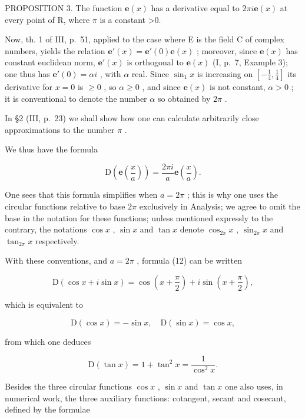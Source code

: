 PROPOSITION 3. The function \(\mathbf{e}(x)\) has a derivative equal to \(2\pi i\mathbf{e}(x)\) at every point of R, where \(\pi\) is a constant \textgreater0.

Now, th. 1 of III, p.~51, applied to the case where E is the field C of complex numbers, yields the relation \(\mathbf{e}'(x) = \mathbf{e}'(0)\mathbf{e}(x)\) ; moreover, since \(\mathbf{e}(x)\) has constant euclidean norm, \(\mathbf{e}'(x)\) is orthogonal to \(\mathbf{e}(x)\) (I, p.~7, Example 3); one thus has \(\mathbf{e}'(0) = \alpha i\) , with \(\alpha\) real. Since \(\sin_1 x\) is increasing on \([- \frac{1}{4}, \frac{1}{4}]\) its derivative for \(x = 0\) is \(\geqslant 0\) , so \(\alpha \geqslant 0\) , and since \(\mathbf{e}(x)\) is not constant, \(\alpha > 0\) ; it is conventional to denote the number \(\alpha\) so obtained by \(2\pi\) .

In §2 (III, p.~23) we shall show how one can calculate arbitrarily close approximations to the number \(\pi\) .

We thus have the formula

\[
\mathrm{D} \left(\mathbf {e} \left(\frac {x}{a}\right)\right) = \frac {2 \pi i}{a} \mathbf {e} \left(\frac {x}{a}\right).\tag{12}
\]

One sees that this formula simplifies when \(a = 2\pi\) ; this is why one uses the circular functions relative to base \(2\pi\) exclusively in Analysis; we agree to omit the base in the notation for these functions; unless mentioned expressly to the contrary, the notations \(\cos x\) , \(\sin x\) and \(\tan x\) denote \(\cos_{2\pi}x\) , \(\sin_{2\pi}x\) and \(\tan_{2\pi}x\) respectively.

With these conventions, and \(a = 2\pi\) , formula (12) can be written

\[
\mathrm{D} (\cos x + i \sin x) = \cos \left(x + \frac {\pi}{2}\right) + i \sin \left(x + \frac {\pi}{2}\right),\tag{13}
\]

which is equivalent to

\[
\mathrm{D} (\cos x) = - \sin x, \quad \mathrm{D} (\sin x) = \cos x,
\]

from which one deduces

\[
\mathrm{D} (\tan x) = 1 + \tan^ {2} x = \frac {1}{\cos^ {2} x}.\tag{15}
\]

Besides the three circular functions \(\cos x\) , \(\sin x\) and \(\tan x\) one also uses, in numerical work, the three auxiliary functions: cotangent, secant and cosecant, defined by the formulae

